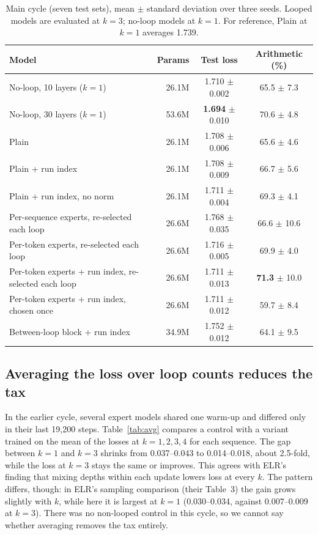 \documentclass[11pt]{article}
\begin{document}
\begin{table}[t]
\centering\small
\begin{tabular}{lrcc}
\toprule
Model & Params & Test loss & Arithmetic (\%) \\
\midrule
No-loop, 10 layers ($k{=}1$) & 26.1M & 1.710 $\pm$ 0.002 & 65.5 $\pm$ 7.3 \\
No-loop, 30 layers ($k{=}1$) & 53.6M & \textbf{1.694} $\pm$ 0.010 & 70.6 $\pm$ 4.8 \\
\midrule
Plain & 26.1M & 1.708 $\pm$ 0.006 & 65.6 $\pm$ 4.6 \\
Plain + run index & 26.1M & 1.708 $\pm$ 0.009 & 66.7 $\pm$ 5.6 \\
Plain + run index, no norm & 26.1M & 1.711 $\pm$ 0.004 & 69.3 $\pm$ 4.1 \\
Per-sequence experts, re-selected each loop & 26.6M & 1.768 $\pm$ 0.035 & 66.6 $\pm$ 10.6 \\
Per-token experts, re-selected each loop & 26.6M & 1.716 $\pm$ 0.005 & 69.9 $\pm$ 4.0 \\
Per-token experts + run index, re-selected each loop & 26.6M & 1.711 $\pm$ 0.013 & \textbf{71.3} $\pm$ 10.0 \\
Per-token experts + run index, chosen once & 26.6M & 1.711 $\pm$ 0.012 & 59.7 $\pm$ 8.4 \\
Between-loop block + run index & 34.9M & 1.752 $\pm$ 0.012 & 64.1 $\pm$ 9.5 \\
\bottomrule
\end{tabular}
\caption{Main cycle (seven test sets), mean $\pm$ standard deviation over three seeds. Looped models are evaluated at $k{=}3$; no-loop models at $k{=}1$. For reference, Plain at $k{=}1$ averages 1.739.}
\label{tab:main}
\end{table}

\subsection{Averaging the loss over loop counts reduces the tax}
In the earlier cycle, several expert models shared one warm-up and differed only in their last 19{,}200 steps. Table~\ref{tab:avg} compares a control with a variant trained on the mean of the losses at $k=1,2,3,4$ for each sequence. The gap between $k{=}1$ and $k{=}3$ shrinks from 0.037--0.043 to 0.014--0.018, about 2.5-fold, while the loss at $k{=}3$ stays the same or improves. This agrees with ELR's finding that mixing depths within each update lowers loss at every $k$. The pattern differs, though: in ELR's sampling comparison (their Table~3) the gain grows slightly with $k$, while here it is largest at $k{=}1$ (0.030--0.034, against 0.007--0.009 at $k{=}3$). There was no non-looped control in this cycle, so we cannot say whether averaging removes the tax entirely.
\end{document}
